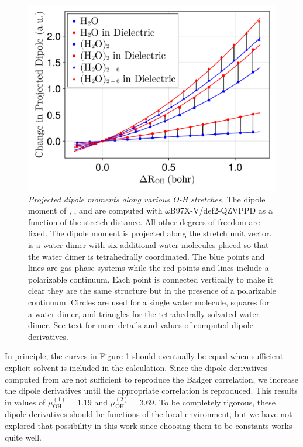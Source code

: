 \documentclass[12pt,letter]{article}
\begin{document}
 \begin{figure} [H]
    \includegraphics[width=\textwidth]{figures/dipole_derivatives.png}
    \caption{\textit{Projected dipole moments along various O-H stretches.}
    The dipole moment of , , and  are computed with
    $\omega$B97X-V/def2-QZVPPD as a function of the  stretch distance. All other degrees of freedom are fixed.
    The dipole moment is projected along the  stretch unit vector. 
    is a water dimer with six additional water molecules placed so that the water dimer is
    tetrahedrally coordinated. The blue points and lines are gas-phase systems while the
    red points and lines include a polarizable continuum. Each point is connected vertically
    to make it clear they are the same structure but in the presence of a polarizable continuum.
    Circles are used for a single water molecule, squares for a water dimer, and triangles for
    the tetrahedrally solvated water dimer. See text for more details and values of computed dipole derivatives.
}
    \label{fig:dip_derivatives}
\end{figure}

In principle, the curves in Figure \ref{fig:dip_derivatives} should eventually be equal when sufficient
explicit solvent is included in the calculation. Since the dipole derivatives computed from
 are not sufficient to reproduce the Badger correlation, we increase
the dipole derivatives until the appropriate correlation is reproduced. This results in values
of $\mu_{\mathrm{OH}}^{(1)}=1.19$ and $\mu_{\mathrm{OH}}^{(2)}=3.69$. To be completely rigorous,
these dipole derivatives should be functions of the local environment, but we have not explored
that possibility in this work since choosing them to be constants works quite well.



    
\end{document}
